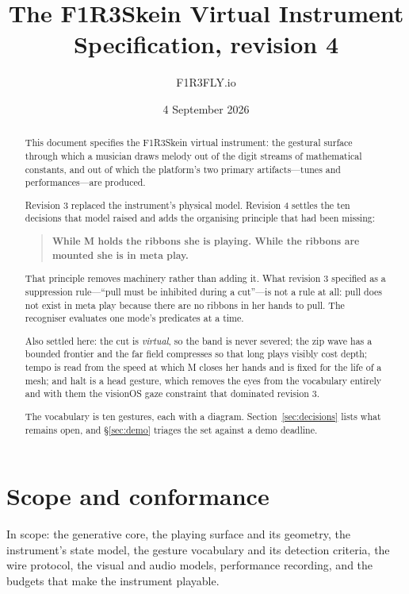 \documentclass[11pt,a4paper]{article}
\title{\textbf{The F1R3Skein Virtual Instrument}\\[0.3em]
\large Specification, revision 4}
\author{F1R3FLY.io}
\date{4 September 2026}
\theoremstyle{definition}
\theoremstyle{plain}
\theoremstyle{remark}
\begin{document}
\maketitle

\begin{abstract}
\noindent
This document specifies the F1R3Skein virtual instrument: the gestural surface through which a
musician draws melody out of the digit streams of mathematical constants, and out of which the
platform's two primary artifacts---tunes and performances---are produced.

Revision 3 replaced the instrument's physical model. Revision 4 settles the ten decisions that
model raised and adds the organising principle that had been missing:

\begin{quote}
\textbf{While M holds the ribbons she is playing. While the ribbons are mounted she is in meta
play.}
\end{quote}

That principle removes machinery rather than adding it. What revision 3 specified as a
suppression rule---``pull must be inhibited during a cut''---is not a rule at all: pull does not
exist in meta play because there are no ribbons in her hands to pull. The recogniser evaluates one
mode's predicates at a time.

Also settled here: the cut is \emph{virtual}, so the band is never severed; the zip wave has a
bounded frontier and the far field compresses so that long plays visibly cost depth; tempo is read
from the speed at which M closes her hands and is fixed for the life of a mesh; and halt is a head
gesture, which removes the eyes from the vocabulary entirely and with them the visionOS gaze
constraint that dominated revision 3.

The vocabulary is ten gestures, each with a diagram. Section~\ref{sec:decisions} lists what
remains open, and \S\ref{sec:demo} triages the set against a demo deadline.
\end{abstract}

\tableofcontents

\section{Scope and conformance}

In scope: the generative core, the playing surface and its geometry, the instrument's state model,
the gesture vocabulary and its detection criteria, the wire protocol, the visual and audio models,
performance recording, and the budgets that make the instrument playable.
\end{document}
